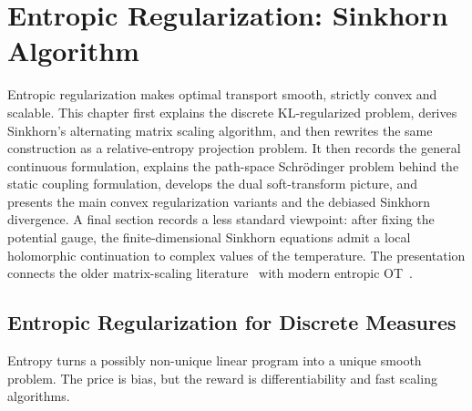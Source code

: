 

\chapter{Entropic Regularization: Sinkhorn Algorithm}
\label{sec-sinkhorn}

Entropic regularization makes optimal transport smooth, strictly convex and scalable. This chapter first explains the discrete KL-regularized problem, derives Sinkhorn's alternating matrix scaling algorithm, and then rewrites the same construction as a relative-entropy projection problem. It then records the general continuous formulation, explains the path-space Schr\"odinger problem behind the static coupling formulation, develops the dual soft-transform picture, and presents the main convex regularization variants and the debiased Sinkhorn divergence. A final section records a less standard viewpoint: after fixing the potential gauge, the finite-dimensional Sinkhorn equations admit a local holomorphic continuation to complex values of the temperature. The presentation connects the older matrix-scaling literature~\cite{Sinkhorn64,SinkhornKnopp67,Sinkhorn67} with modern entropic OT~\cite{CuturiSinkhorn,peyre2019computational}.

\section{Entropic Regularization for Discrete Measures}
\label{sec-entropic-discrete}

Entropy turns a possibly non-unique linear program into a unique smooth problem. The price is bias, but the reward is differentiability and fast scaling algorithms.

